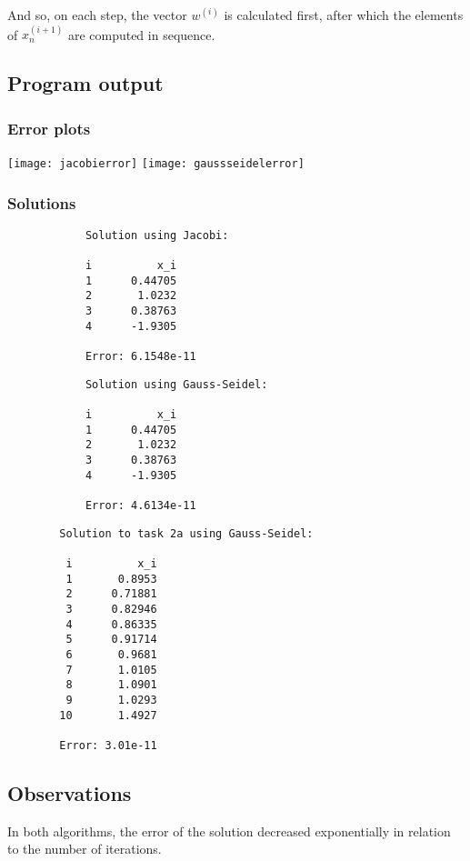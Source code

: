\documentclass{article}
\begin{document}
	And so, on each step, the vector $w^{(i)}$ is calculated first, after which
	the elements of $x_n^{(i + 1)}$ are computed in sequence.

	\subsection{Program output}

	\subsubsection{Error plots}

	\texttt{[image: jacobierror]}
	\texttt{[image: gaussseidelerror]}

	\subsubsection{Solutions}

	\begin{multicols}{2}
		\begin{verbatim}
			Solution using Jacobi:

			i          x_i
			1      0.44705
			2       1.0232
			3      0.38763
			4      -1.9305

			Error: 6.1548e-11
		\end{verbatim}
		\begin{verbatim}
			Solution using Gauss-Seidel:

			i          x_i
			1      0.44705
			2       1.0232
			3      0.38763
			4      -1.9305

			Error: 4.6134e-11
		\end{verbatim}
	\end{multicols}

	\begin{verbatim}
		Solution to task 2a using Gauss-Seidel:

		 i          x_i
		 1       0.8953
		 2      0.71881
		 3      0.82946
		 4      0.86335
		 5      0.91714
		 6       0.9681
		 7       1.0105
		 8       1.0901
		 9       1.0293
		10       1.4927

		Error: 3.01e-11
	\end{verbatim}

	\subsection{Observations}

	In both algorithms, the error of the solution decreased exponentially in
	relation to the number of iterations.
\end{document}
